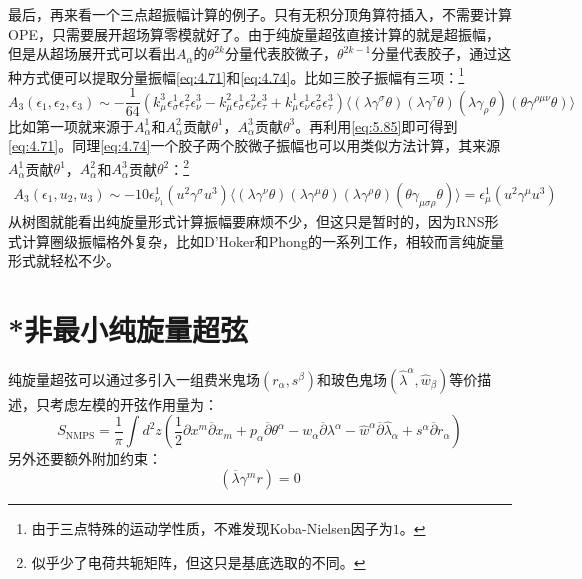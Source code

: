 最后，再来看一个三点超振幅计算的例子。只有无积分顶角算符插入，不需要计算OPE，只需要展开超场算零模就好了。由于纯旋量超弦直接计算的就是超振幅，但是从超场展开式可以看出$A_\alpha$的$\theta^{2k}$分量代表胶微子，$\theta^{2k-1}$分量代表胶子，通过这种方式便可以提取分量振幅\ref{eq:4.71}和\ref{eq:4.74}。比如三胶子振幅有三项：\footnote{由于三点特殊的运动学性质，不难发现Koba-Nielsen因子为$1$。}
\begin{equation}
		A_{3}(\epsilon_1,\epsilon_2,\epsilon_3) \sim -\frac{1}{64} \left( k_{\mu}^{3} \epsilon_{\sigma}^{1} \epsilon_{\tau}^{2} \epsilon_{\nu}^{3} - k_{\mu}^{2} \epsilon_{\sigma}^{1} \epsilon_{\nu}^{2} \epsilon_{\tau}^{3} + k_{\mu}^{1} \epsilon_{\nu}^{1} \epsilon_{\sigma}^{2} \epsilon_{\tau}^{3} \right) \big\langle (\lambda \gamma^{\sigma} \theta)(\lambda \gamma^{\tau} \theta)(\lambda \gamma_{\rho} \theta)(\theta \gamma^{\rho\mu\nu} \theta) \big\rangle
\end{equation}
比如第一项就来源于$A^1_\alpha$和$A^2_\alpha$贡献$\theta^1$，$A^3_\alpha$贡献$\theta^3$。再利用\ref{eq:5.85}即可得到\ref{eq:4.71}。同理\ref{eq:4.74}一个胶子两个胶微子振幅也可以用类似方法计算，其来源$A^1_\alpha$贡献$\theta^1$，$A^2_\alpha$和$A^3_\alpha$贡献$\theta^2$：\footnote{似乎少了电荷共轭矩阵，但这只是基底选取的不同。}
\begin{equation}
	\begin{aligned}
		A_{3}(\epsilon_1,u_2,u_3) 
		\sim -10 \epsilon_{\nu_1}^1 (u^2 \gamma^\sigma u^3) \big\langle (\lambda \gamma^{\nu} \theta)(\lambda \gamma^{\mu} \theta)(\lambda \gamma^{\rho} \theta)(\theta \gamma_{\mu\sigma\rho} \theta) \big\rangle 
		= \epsilon_\mu^1 (u^2 \gamma^\mu u^3)
	\end{aligned}
\end{equation}
从树图就能看出纯旋量形式计算振幅要麻烦不少，但这只是暂时的，因为RNS形式计算圈级振幅格外复杂，比如D'Hoker和Phong的一系列工作\cite{DHoker:2001kkt,DHoker:2001qqx,DHoker:2001foj,DHoker:2001jaf,DHoker:2005dys,DHoker:2005vch,DHoker:2002hof}，相较而言纯旋量形式就轻松不少\cite{Berkovits:2005df,Berkovits:2005ng}。
\section{*非最小纯旋量超弦}
纯旋量超弦可以通过多引入一组费米鬼场$(r_\alpha,s^\beta)$和玻色鬼场$(\hat\lambda^\alpha,\hat w_\beta)$等价描述，只考虑左模的开弦作用量为：\cite{Berkovits:2005bt}
\begin{equation}
	S_{\mathrm{NMPS}}=\frac{1}{\pi}\int d^2z(\frac{1}{2}\partial x^m\overline{\partial}x_m+p_\alpha\overline{\partial}\theta^\alpha-w_\alpha\overline{\partial}\lambda^\alpha-\hat{w}^\alpha\overline{\partial}\hat{\lambda}_\alpha+s^\alpha\overline{\partial}r_\alpha)
\end{equation}
另外还要额外附加约束：
\begin{equation}
	(\overline{\lambda}\gamma^mr)=0
\end{equation}